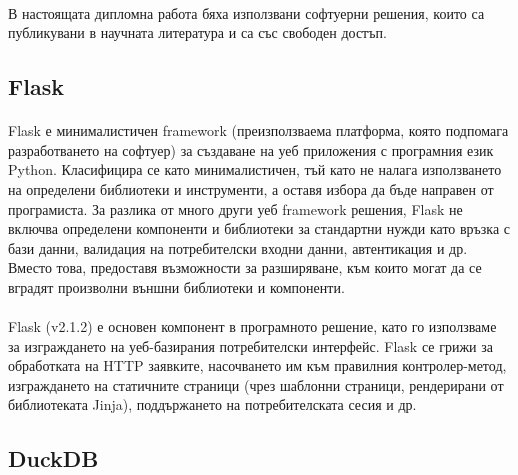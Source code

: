 \documentclass[pdftex,cyrillic,14pt,a4page,twoside,openright]{extreport}
\begin{document}
\paragraph{}
В настоящата дипломна работа бяха използвани софтуерни решения, които са публикувани в научната литература и са със свободен достъп.

\subsection{Flask}
\paragraph{}
Flask \cite{flask} е минималистичен framework (преизползваема платформа, която подпомага разработването на софтуер) за създаване на уеб приложения с програмния език Python. Класифицира се като минималистичен, тъй като не налага използването на определени библиотеки и инструменти, а оставя избора да бъде направен от програмиста. За разлика от много други уеб framework решения, Flask не включва определени компоненти и библиотеки за стандартни нужди като връзка с бази данни, валидация на потребителски входни данни, автентикация и др. Вместо това, предоставя възможности за разширяване, към които могат да се вградят произволни външни библиотеки и компоненти.

\paragraph{}
Flask (v2.1.2) е основен компонент в програмното решение, като го използваме за изграждането на уеб-базирания потребителски интерфейс. Flask се грижи за обработката на HTTP заявките, насочването им към правилния контролер-метод, изграждането на статичните страници (чрез шаблонни страници, рендерирани от библиотеката Jinja), поддържането на потребителската сесия и др.

\subsection{DuckDB}\label{sec:duckdb}
\end{document}
